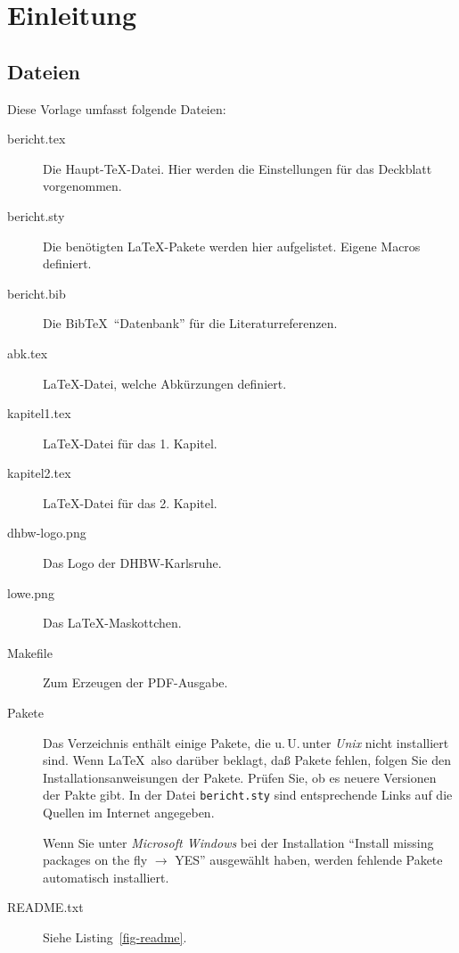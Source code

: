 
\chapter{Einleitung}

\section{Dateien}
Diese Vorlage umfasst folgende Dateien:
\begin{description}
\item[bericht.tex] Die Haupt-\TeX-Datei. Hier werden die Einstellungen für das
     Deckblatt vorgenommen.
\item[bericht.sty] Die benötigten \LaTeX-Pakete werden hier aufgelistet. Eigene Macros definiert.
\item[bericht.bib] Die Bib\TeX\ "`Datenbank"' für die Literaturreferenzen.
\item[abk.tex] \LaTeX-Datei, welche Abkürzungen definiert.
\item[kapitel1.tex] \LaTeX-Datei für das 1. Kapitel.
\item[kapitel2.tex] \LaTeX-Datei für das 2. Kapitel.
\item[dhbw-logo.png] Das Logo der DHBW-Karlsruhe.
\item[lowe.png] Das \LaTeX-Maskottchen.
\item[Makefile] Zum Erzeugen der PDF-Ausgabe.
\item[Pakete] Das Verzeichnis enthält einige Pakete, die u.\,U.\,unter \emph{Unix} nicht installiert
     sind. Wenn \LaTeX\ also darüber beklagt, daß Pakete fehlen, folgen Sie den Installationsanweisungen
     der Pakete. Prüfen Sie, ob es neuere Versionen der Pakte gibt. In der Datei
     \texttt{bericht.sty} sind entsprechende Links auf die Quellen im Internet angegeben.

     Wenn Sie unter \emph{Microsoft Windows} bei der Installation
     \enquote{Install missing packages on the fly $\longrightarrow$ YES} ausgewählt haben,
     werden fehlende Pakete automatisch installiert.
\item[README.txt] Siehe Listing~\ref{fig-readme}.
\end{description}

